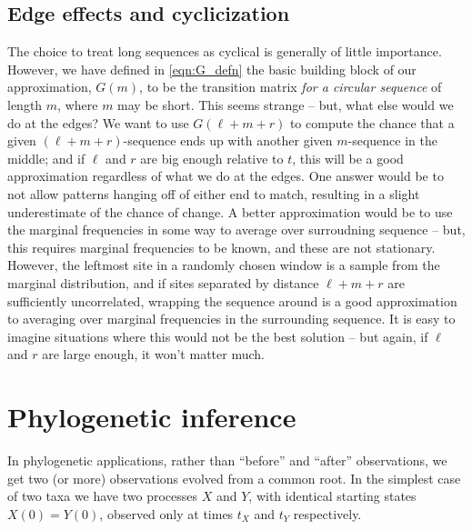 \documentclass{article}
\theoremstyle{plain}
\theoremstyle{definition}
\begin{document}
\subsection{Edge effects and cyclicization}

The choice to treat long sequences as cyclical is generally of little importance.
However, we have defined in \eqref{eqn:G_defn} the basic building block of our approximation, $G(m)$,
to be the transition matrix \emph{for a circular sequence} of length $m$, where $m$ may be short.
This seems strange -- but, what else would we do at the edges?
We want to use $G(\ell+m+r)$ to compute the chance that a given $(\ell+m+r)$-sequence ends up with another given $m$-sequence in the middle;
and if $\ell$ and $r$ are big enough relative to $t$, this will be a good approximation regardless of what we do at the edges.
One answer would be to not allow patterns hanging off of either end to match,
resulting in a slight underestimate of the chance of change.
A better approximation would be to use the marginal frequencies in some way to average over surroudning sequence
-- but, this requires marginal frequencies to be known, and these are not stationary.
However, the leftmost site in a randomly chosen window is a sample from the marginal distribution,
and if sites separated by distance $\ell+m+r$ are sufficiently uncorrelated,
wrapping the sequence around is a good approximation to averaging over marginal frequencies in the surrounding sequence.
It is easy to imagine situations where this would not be the best solution --
but again, if $\ell$ and $r$ are large enough, it won't matter much.

\section{Phylogenetic inference}

In phylogenetic applications, rather than ``before'' and ``after'' observations,
we get two (or more) observations evolved from a common root.
In the simplest case of two taxa we have two processes $X$ and $Y$,
with identical starting states $X(0)=Y(0)$,
observed only at times $t_X$ and $t_Y$ respectively.
\end{document}
